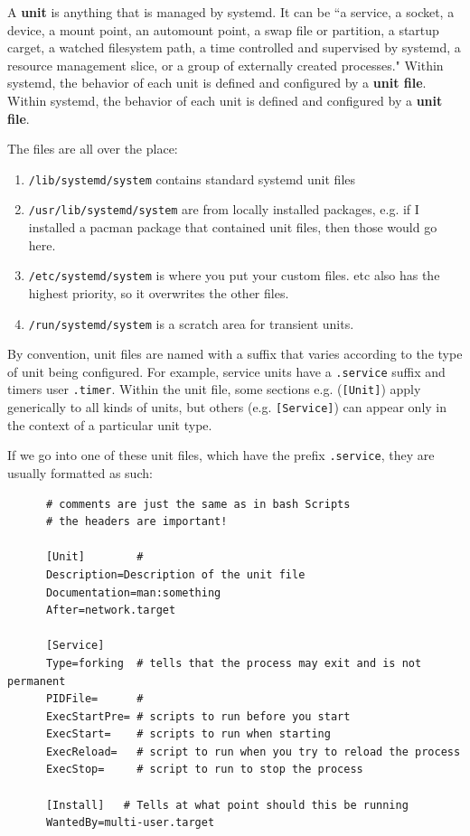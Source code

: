   \begin{definition}
    A \textbf{unit} is anything that is managed by systemd. It can be ``a service, a socket, a device, a mount point, an automount point, a swap file or partition, a startup carget, a watched filesystem path, a time controlled and supervised by systemd, a resource management slice, or a group of externally created processes." Within systemd, the behavior of each unit is defined and configured by a \textbf{unit file}. Within systemd, the behavior of each unit is defined and configured by a \textbf{unit file}. 

    The files are all over the place: 
      \begin{enumerate}
        \item \texttt{/lib/systemd/system} contains standard systemd unit files 
        \item \texttt{/usr/lib/systemd/system} are from locally installed packages, e.g. if I installed a pacman package that contained unit files, then those would go here. 
        \item \texttt{/etc/systemd/system} is where you put your custom files. etc also has the highest priority, so it overwrites the other files.  
        \item \texttt{/run/systemd/system} is a scratch area for transient units. 
      \end{enumerate}

    By convention, unit files are named with a suffix that varies according to the type of unit being configured. For example, service units have a \texttt{.service} suffix and timers user \texttt{.timer}. Within the unit file, some sections e.g. (\texttt{[Unit]}) apply generically to all kinds of units, but others (e.g. \texttt{[Service]}) can appear only in the context of a particular unit type. 

  \end{definition}

  \begin{example}
    If we go into one of these unit files, which have the prefix \texttt{.service}, they are usually formatted as such: 

    \begin{lstlisting}
      # comments are just the same as in bash Scripts
      # the headers are important! 

      [Unit]        #  
      Description=Description of the unit file 
      Documentation=man:something 
      After=network.target

      [Service]
      Type=forking  # tells that the process may exit and is not permanent
      PIDFile=      # 
      ExecStartPre= # scripts to run before you start 
      ExecStart=    # scripts to run when starting 
      ExecReload=   # script to run when you try to reload the process
      ExecStop=     # script to run to stop the process 

      [Install]   # Tells at what point should this be running
      WantedBy=multi-user.target 

    \end{lstlisting} 
  \end{example}
  
